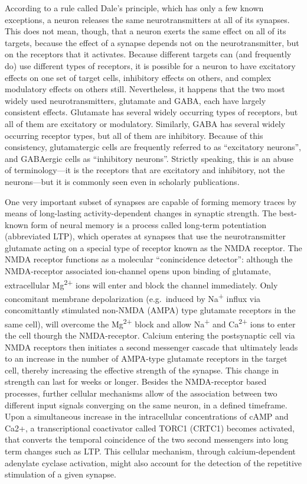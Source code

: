According to a rule called Dale's principle, which has only a few known exceptions, a neuron releases the same neurotransmitters at all of its synapses. This does not mean, though, that a neuron exerts the same effect on all of its targets, because the effect of a synapse depends not on the neurotransmitter, but on the receptors that it activates. Because different targets can (and frequently do) use different types of receptors, it is possible for a neuron to have excitatory effects on one set of target cells, inhibitory effects on others, and complex modulatory effects on others still. Nevertheless, it happens that the two most widely used neurotransmitters, glutamate and GABA, each have largely consistent effects. Glutamate has several widely occurring types of receptors, but all of them are excitatory or modulatory. Similarly, GABA has several widely occurring receptor types, but all of them are inhibitory. Because of this consistency, glutamatergic cells are frequently referred to as ``excitatory neurons'', and GABAergic cells as ``inhibitory neurons''. Strictly speaking, this is an abuse of terminology---it is the receptors that are excitatory and inhibitory, not the neurons---but it is commonly seen even in scholarly publications.

One very important subset of synapses are capable of forming memory traces by means of long-lasting activity-dependent changes in synaptic strength. The best-known form of neural memory is a process called long-term potentiation (abbreviated LTP), which operates at synapses that use the neurotransmitter glutamate acting on a special type of receptor known as the NMDA receptor. The NMDA receptor functions as a molecular ``conincidence detector'': although the NMDA-receptor associated ion-channel opens upon binding of glutamate, extracellular Mg\textsuperscript{2+} ions will enter and block the channel immediately. Only concomitant membrane depolarization (e.g.~induced by Na\textsuperscript{+} influx via concomittantly stimulated non-NMDA (AMPA) type glutamate receptors in the same cell), will overcome the Mg\textsuperscript{2+} block and allow Na\textsuperscript{+} and Ca\textsuperscript{2+} ions to enter the cell thourgh the NMDA-receptor. Calcium entering the postsynaptic cell via NMDA receptors then initiates a second messenger cascade that ultimately leads to an increase in the number of AMPA-type glutamate receptors in the target cell, thereby increasing the effective strength of the synapse. This change in strength can last for weeks or longer. Besides the NMDA-receptor based processes, further cellular mechanisms allow of the association between two different input signals converging on the same neuron, in a defined timeframe. Upon a simultaneous increase in the intracellular concentrations of cAMP and Ca2+, a transcriptional coactivator called TORC1 (CRTC1) becomes activated, that converts the temporal coincidence of the two second messengers into long term changes such as LTP. This cellular mechanism, through calcium-dependent adenylate cyclase activation, might also account for the detection of the repetitive stimulation of a given synapse.

